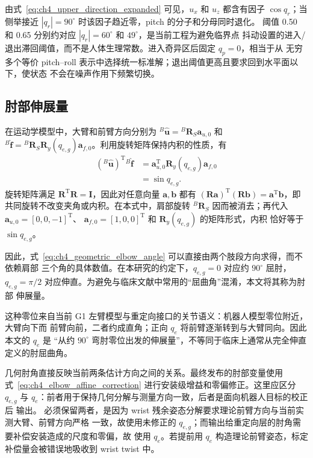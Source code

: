 由式~\eqref{eq:ch4_upper_direction_expanded} 可见，$u_x$ 和 $u_z$ 都含有因子
$\cos q_r$；当侧举接近 $|q_r|=90^\circ$ 时该因子趋近零，pitch 的分子和分母同时退化。
阈值 0.50 和 0.65 分别约对应 $|q_r|=60^\circ$ 和 $49^\circ$，是当前工程为避免临界点
抖动设置的进入/退出滞回阈值，而不是人体生理常数。进入奇异区后固定 $q_p=0$，相当于从
无穷多个等价 pitch--roll 表示中选择统一标准解；退出阈值更高且要求回到水平面以下，使状态
不会在噪声作用下频繁切换。

\subsection{肘部伸展量}
\label{subsec:ch4_online_elbow_angle}

在运动学模型中，大臂和前臂方向分别为
${}^{B}\hat{\boldsymbol u}={}^B\boldsymbol R_S\boldsymbol a_{u,0}$ 和
${}^{B}\hat{\boldsymbol f}={}^B\boldsymbol R_S
\boldsymbol R_y(q_{e,g})\boldsymbol a_{f,0}$。利用旋转矩阵保持内积的性质，有
\begin{align}
  ({}^{B}\hat{\boldsymbol u})^{\mathrm T}
  {}^{B}\hat{\boldsymbol f}
  &=\boldsymbol a_{u,0}^{\mathrm T}
    \boldsymbol R_y(q_{e,g})\boldsymbol a_{f,0}
  \nonumber\\
  &=\sin q_{e,g}.
  \label{eq:ch4_elbow_dot_product_derivation}
\end{align}
旋转矩阵满足 $\boldsymbol R^{\mathrm T}\boldsymbol R=\boldsymbol I$，因此对任意向量
$\boldsymbol a,\boldsymbol b$ 都有
$(\boldsymbol R\boldsymbol a)^{\mathrm T}(\boldsymbol R\boldsymbol b)
=\boldsymbol a^{\mathrm T}\boldsymbol b$，即共同旋转不改变夹角或内积。在本式中，肩部旋转
${}^{B}\boldsymbol R_S$ 因而被消去；再代入
$\boldsymbol a_{u,0}=[0,0,-1]^{\mathrm T}$、
$\boldsymbol a_{f,0}=[1,0,0]^{\mathrm T}$ 和 $\boldsymbol R_y(q_{e,g})$ 的矩阵形式，内积
恰好等于 $\sin q_{e,g}$。

因此，式~\eqref{eq:ch4_geometric_elbow_angle} 可以直接由两个肢段方向求得，而不依赖肩部
三个角的具体数值。在本研究的约定下，$q_{e,g}=0$ 对应约 $90^\circ$ 屈肘，
$q_{e,g}=\pi/2$ 对应伸直。为避免与临床文献中常用的“屈曲角”混淆，本文将其称为肘部
伸展量。

这种零位来自当前 G1 左臂模型与重定向接口的关节语义：机器人模型零位附近，大臂向下而
前臂向前，二者约成直角；正向 $q_e$ 将前臂逐渐转到与大臂同向。因此本文的 $q_e$ 是
“从约 $90^\circ$ 弯肘零位出发的伸展量”，不等同于临床上通常从完全伸直定义的肘屈曲角。

几何肘角直接反映当前两条估计方向之间的关系。最终发布的肘部变量使用
式~\eqref{eq:ch4_elbow_affine_correction} 进行安装级增益和零偏修正。这里应区分
$q_{e,g}$ 与 $q_e$：前者用于保持几何分解与测量方向一致，后者是面向机器人目标的校正后
输出。
必须保留两者，是因为 wrist 残余姿态分解要求理论前臂方向与当前实测大臂、前臂方向严格
一致，故使用未修正的 $q_{e,g}$；而输出给重定向层的肘角需要补偿安装造成的尺度和零偏，故
使用 $q_e$。若提前用 $q_e$ 构造理论前臂姿态，标定补偿量会被错误地吸收到 wrist twist 中。

